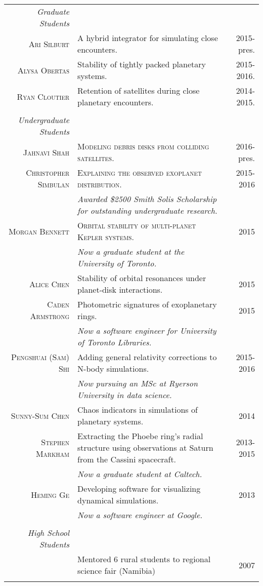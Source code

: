 \documentclass[10pt]{article} %
\begin{document}
{\begin{tabular}{r|p{9.9cm}r}
{\it Graduate Students} \\
\textsc{Ari Silburt} & A hybrid integrator for simulating close encounters. & 2015-pres. \\
\textsc{Alysa Obertas} & Stability of tightly packed planetary systems. & 2015-2016. \\
\textsc{Ryan Cloutier} & Retention of satellites during close planetary encounters. & 2014-2015. \\
\\
{\it Undergraduate Students} \\
\textsc{Jahnavi Shah} & \textsc{Modeling debris disks from colliding satellites.} & 2016-pres. \\
\textsc{Christopher Simbulan} & \textsc{Explaining the observed exoplanet distribution.} & 2015-2016 \\
& {\it Awarded \$2500 Smith Solis Scholarship for outstanding undergraduate research.}\\
\textsc{Morgan Bennett} & \textsc{Orbital stability of multi-planet Kepler systems.} & 2015  \\
& {\it Now a graduate student at the University of Toronto.} \\
\textsc{Alice Chen} & Stability of orbital resonances under planet-disk interactions. & 2015 \\
\textsc{Caden Armstrong} & Photometric signatures of exoplanetary rings. & 2015 \\
& {\it Now a software engineer for University of Toronto Libraries.} \\
\textsc{Pengshuai (Sam) Shi} & Adding general relativity corrections to N-body simulations. & 2015-2016 \\
& {\it Now pursuing an MSc at Ryerson University in data science.} \\
\textsc{Sunny-Sum Chen} & Chaos indicators in simulations of planetary systems. & 2014 \\
\textsc{Stephen Markham} & Extracting the Phoebe ring's radial structure using observations at Saturn from the Cassini spacecraft. & 2013-2015 \\
& {\it Now a graduate student at Caltech.} \\
\textsc{Heming Ge} & Developing software for visualizing dynamical simulations. & 2013 \\
& {\it Now a software engineer at Google.} \\
\\
{\it High School Students} \\
& Mentored 6 rural students to regional science fair (Namibia) & 2007 \\
\multicolumn{3}{c}{} \\
\end{tabular}

}
\end{document}
